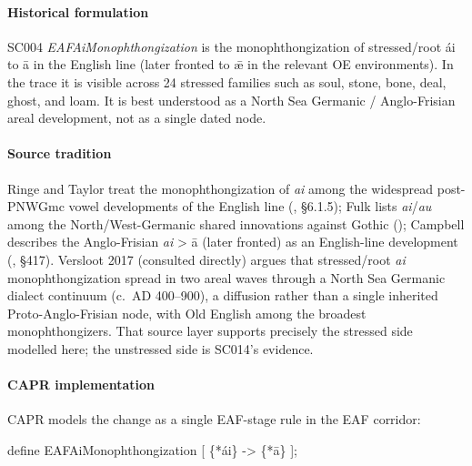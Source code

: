 \documentclass[
  british,
  a4paper,
]{article}
\newenvironment{Shaded}{}{}
\newcommand{\NormalTok}[1]{#1}
\begin{document}
\paragraph{Historical formulation}\label{historical-formulation-1}

SC004 \emph{EAFAiMonophthongization} is the monophthongization of
stressed/root ái to ā in the English line (later fronted to ǣ in the
relevant OE environments). In the trace it is visible across 24 stressed
families such as soul, stone, bone, deal, ghost, and loam. It is best
understood as a North Sea Germanic / Anglo-Frisian areal development,
not as a single dated node.

\paragraph{Source tradition}\label{source-tradition-1}

Ringe and Taylor treat the monophthongization of \emph{ai} among the
widespread post-PNWGmc vowel developments of the English line
(, §6.1.5);
Fulk lists \emph{ai}/\emph{au} among the North/West-Germanic shared
innovations against Gothic (); Campbell describes the Anglo-Frisian \emph{ai} \textgreater{} ā
(later fronted) as an English-line development
(, §417).
Versloot 2017 (consulted directly) argues that stressed/root \emph{ai}
monophthongization spread in two areal waves through a North Sea
Germanic dialect continuum (c.~AD 400--900), a diffusion rather than a
single inherited Proto-Anglo-Frisian node, with Old English among the
broadest monophthongizers. That source layer supports precisely the
stressed side modelled here; the unstressed side is SC014's evidence.

\paragraph{CAPR implementation}\label{capr-implementation-1}

CAPR models the change as a single EAF-stage rule in the EAF corridor:

\begin{Shaded}
\begin{Highlighting}[]
\NormalTok{define EAFAiMonophthongization [}
\NormalTok{    \{*ái\} {-}\textgreater{} \{*ā\}}
\NormalTok{];}
\end{Highlighting}
\end{Shaded}
\end{document}
